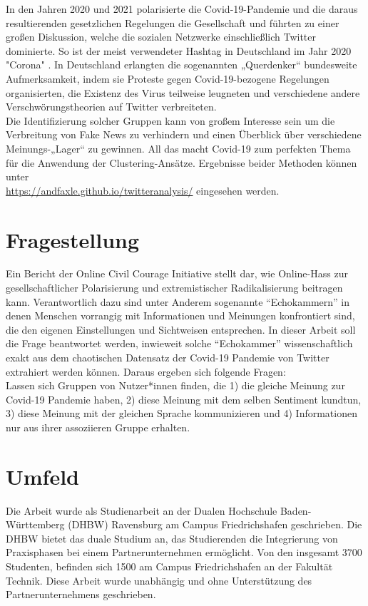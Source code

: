 In den Jahren 2020 und 2021 polarisierte die Covid-19-Pandemie und die daraus resultierenden gesetzlichen Regelungen die Gesellschaft und führten zu einer großen Diskussion, welche die sozialen Netzwerke einschließlich Twitter dominierte. So ist der meist verwendeter Hashtag in Deutschland im Jahr 2020 "Corona" \cite{top-hashtags-de}. In Deutschland erlangten die sogenannten „Querdenker“ bundesweite Aufmerksamkeit, indem sie Proteste gegen Covid-19-bezogene Regelungen organisierten, die Existenz des Virus teilweise leugneten und verschiedene andere Verschwörungstheorien auf Twitter verbreiteten. \\ \newline
Die Identifizierung solcher Gruppen kann von großem Interesse sein um die Verbreitung von Fake News zu verhindern und einen Überblick über verschiedene Meinungs-„Lager“ zu gewinnen. All das macht Covid-19 zum perfekten Thema für die Anwendung der Clustering-Ansätze.
Ergebnisse beider Methoden können unter\\ \url{https://andfaxle.github.io/twitteranalysis/} eingesehen werden.
\section{Fragestellung}
\label{sec:fragestellung}
Ein Bericht der Online Civil Courage Initiative stellt dar, wie Online-Hass zur gesellschaftlicher Polarisierung und extremistischer Radikalisierung beitragen kann.
Verantwortlich dazu sind unter Anderem sogenannte "`Echokammern"' in denen Menschen vorrangig mit Informationen und Meinungen konfrontiert sind, die den eigenen Einstellungen und Sichtweisen entsprechen. \cite{hassrede} In dieser Arbeit soll die Frage beantwortet werden, inwieweit solche "`Echokammer"' wissenschaftlich exakt aus dem chaotischen Datensatz der Covid-19 Pandemie von Twitter extrahiert werden können. Daraus ergeben sich folgende Fragen: \\ \newline
Lassen sich Gruppen von Nutzer*innen finden, die 1) die gleiche Meinung zur Covid-19 Pandemie haben, 2) diese Meinung mit dem selben Sentiment kundtun, 3) diese Meinung mit der gleichen Sprache kommunizieren und 4) Informationen nur aus ihrer assoziieren Gruppe erhalten.
\section{Umfeld}
\label{sec:umfeld}
Die Arbeit wurde als Studienarbeit an der Dualen Hochschule Baden-Württemberg (DHBW) Ravensburg am Campus Friedrichshafen geschrieben. Die DHBW bietet das duale Studium an, das Studierenden die Integrierung von Praxisphasen bei einem Partnerunternehmen ermöglicht. Von den insgesamt 3700 Studenten, befinden sich 1500 am Campus Friedrichshafen an der Fakultät Technik.
Diese Arbeit wurde unabhängig und ohne Unterstützung des Partnerunternehmens geschrieben.
